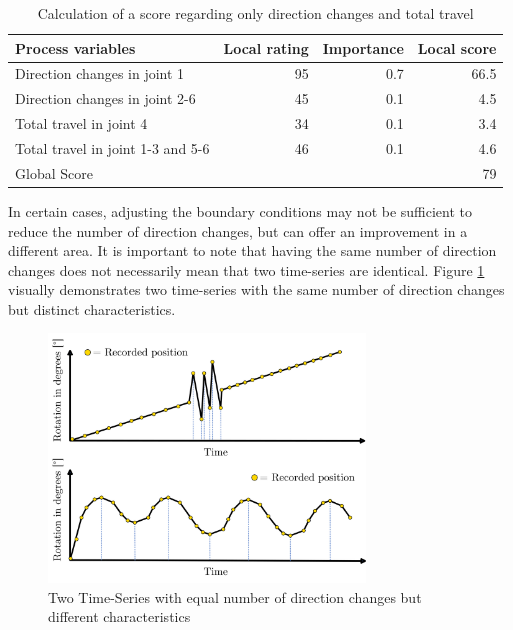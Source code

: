 \begin{table}[H]
	\centering
	\begin{tabular}{||l|r|r|r||}
		Process variables & Local rating & Importance & Local score\\
		\hline
		\hline
		\hline
		
		Direction changes in joint 1 & 95 & 0.7 & 66.5\\
		Direction changes in joint 2-6 & 45& 0.1&4.5\\
		Total travel in joint 4& 34& 0.1&3.4\\
		Total travel in joint 1-3 and 5-6& 46&0.1&4.6\\
		\hline
		\hline
		\hline
		Global Score& & &79\\
		\hline
		\hline
	\end{tabular}
	
	\caption{Calculation of a score regarding only direction changes and total travel}
	\label{exampleDirTravel}
\end{table}


In certain cases, adjusting the boundary conditions may not be sufficient to reduce the number of direction changes, but can offer an improvement in a different area. It is important to note that having the same number of direction changes does not necessarily mean that two time-series are identical. Figure \ref{dirchangeSTD} visually demonstrates two time-series with the same number of direction changes but distinct characteristics.

\begin{figure}[H]
	\centerline{\includegraphics[width=0.75\textwidth]{figures/DirSTD.png}}
	\caption{Two Time-Series with equal number of direction changes but different characteristics}
	\label{dirchangeSTD}
\end{figure}

